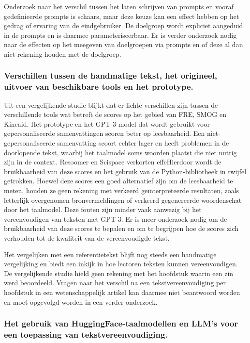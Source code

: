 \medskip

Onderzoek naar het verschil tussen het laten schrijven van prompts en vooraf gedefinieerde prompts is schaars, maar deze keuze kan een effect hebben op het gedrag of ervaring van de eindgebruiker. De doelgroep wordt expliciet aangeduid in de prompts en is daarmee parameteriseerbaar. Er is verder onderzoek nodig naar de effecten op het meegeven van doelgroepen via prompts en of deze al dan niet rekening houden met de doelgroep.

\subsubsection{Verschillen tussen de handmatige tekst, het origineel, uitvoer van beschikbare tools en het prototype.}

Uit een vergelijkende studie blijkt dat er lichte verschillen zijn tussen de verschillende tools wat betreft de scores op het gebied van FRE, SMOG en Kincaid. Het prototype en het GPT-3-model dat wordt gebruikt voor gepersonaliseerde samenvattingen scoren beter op leesbaarheid. Een niet-gepersonaliseerde samenvatting scoort echter lager en heeft problemen in de doorlopende tekst, waarbij het taalmodel soms woorden plaatst die niet nuttig zijn in de context. Resoomer en Scispace verkorten effeHierdoor wordt de bruikbaarheid van deze scores en het gebruik van de Python-bibliotheek in twijfel getrokken. Hoewel deze scores een goed alternatief zijn om de leesbaarheid te meten, houden ze geen rekening met verkeerd geïnterpreteerde resultaten, zoals letterlijk overgenomen bronvermeldingen of verkeerd gegenereerde woordenschat door het taalmodel. Deze fouten zijn minder vaak aanwezig bij het vereenvoudigen van teksten met GPT-3. Er is meer onderzoek nodig om de bruikbaarheid van deze scores te bepalen en om te begrijpen hoe de scores zich verhouden tot de kwaliteit van de vereenvoudigde tekst. 

\medskip

Het vergelijken met een referentietekst blijft nog steeds een handmatige vergelijking en biedt een inkijk in hoe lectoren teksten kunnen vereenvoudigen. De vergelijkende studie hield geen rekening met het hoofdstuk waarin een zin werd beoordeeld. Vragen naar het verschil na een tekstvereenvoudiging per hoofdstuk in een wetenschappelijk artikel kan daarmee niet beantwoord worden en moet opgevolgd worden in een verder onderzoek.

\subsubsection{Het gebruik van HuggingFace-taalmodellen en LLM's voor een toepassing van tekstvereenvoudiging.}

